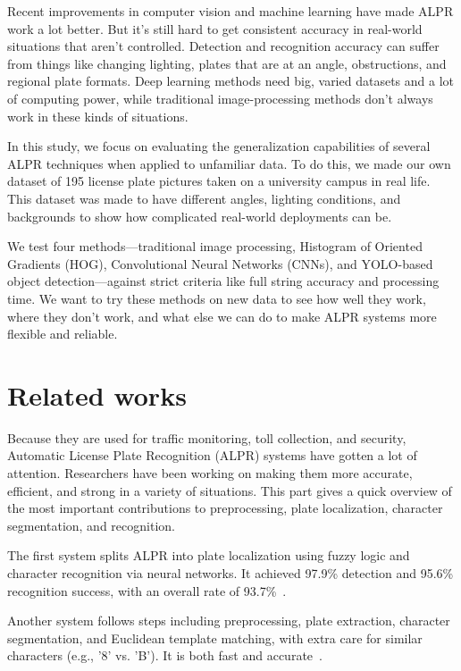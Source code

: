 \documentclass[runningheads]{llncs}
\begin{document}
Recent improvements in computer vision and machine learning have made ALPR work a lot better. But it's still hard to get consistent accuracy in real-world situations that aren't controlled. Detection and recognition accuracy can suffer from things like changing lighting, plates that are at an angle, obstructions, and regional plate formats. Deep learning methods need big, varied datasets and a lot of computing power, while traditional image-processing methods don't always work in these kinds of situations.

In this study, we focus on evaluating the generalization capabilities of several ALPR techniques when applied to unfamiliar data. To do this, we made our own dataset of 195 license plate pictures taken on a university campus in real life. This dataset was made to have different angles, lighting conditions, and backgrounds to show how complicated real-world deployments can be.

We test four methods—traditional image processing, Histogram of Oriented Gradients (HOG), Convolutional Neural Networks (CNNs), and YOLO-based object detection—against strict criteria like full string accuracy and processing time. We want to try these methods on new data to see how well they work, where they don't work, and what else we can do to make ALPR systems more flexible and reliable.


\section{Related works}

Because they are used for traffic monitoring, toll collection, and security, Automatic License Plate Recognition (ALPR) systems have gotten a lot of attention. Researchers have been working on making them more accurate, efficient, and strong in a variety of situations. This part gives a quick overview of the most important contributions to preprocessing, plate localization, character segmentation, and recognition.

The first system splits ALPR into plate localization using fuzzy logic and character recognition via neural networks. It achieved 97.9\% detection and 95.6\% recognition success, with an overall rate of 93.7\%~\cite{chang2004automatic}.

Another system follows steps including preprocessing, plate extraction, character segmentation, and Euclidean template matching, with extra care for similar characters (e.g., '8' vs. 'B'). It is both fast and accurate~\cite{shi2005automatic}.
\end{document}

